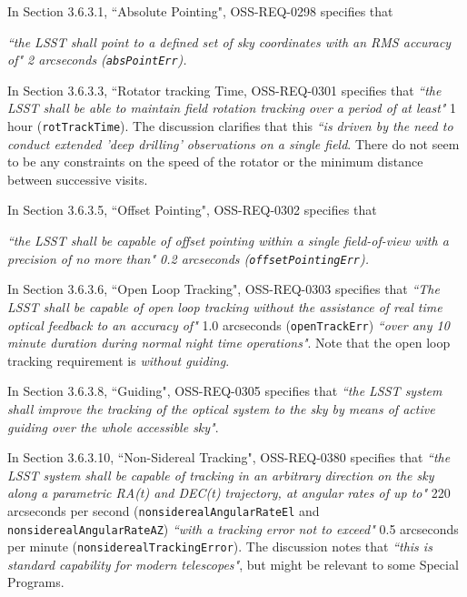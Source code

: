 In Section 3.6.3.1, ``Absolute Pointing", OSS-REQ-0298 specifies that {\it ``the LSST shall point to a defined set of sky coordinates with an RMS accuracy
of" 2 arcseconds ({\tt absPointErr}).

In Section 3.6.3.3, ``Rotator tracking Time, OSS-REQ-0301 specifies that {\it ``the LSST shall be able to maintain field rotation tracking over a period of at least"} 1 hour ({\tt rotTrackTime}).
The discussion clarifies that this {\it ``is driven by the need to conduct extended 'deep drilling' observations on a single field}.
There do not seem to be any constraints on the speed of the rotator or the minimum distance between successive visits.

In Section 3.6.3.5, ``Offset Pointing", OSS-REQ-0302 specifies that {\it ``the LSST shall be capable of offset pointing within a single field-of-view with a precision of no more than" 0.2 arcseconds ({\tt offsetPointingErr}).

In Section 3.6.3.6, ``Open Loop Tracking", OSS-REQ-0303 specifies that {\it ``The LSST shall be capable of open loop tracking without the assistance of real
time optical feedback to an accuracy of"} 1.0 arcseconds ({\tt openTrackErr}) {\it ``over any 10 minute duration during normal night time operations"}.
Note that the open loop tracking requirement is \emph{without guiding}.

In Section 3.6.3.8, ``Guiding", OSS-REQ-0305 specifies that {\it ``the LSST system shall improve the tracking of the optical system to the sky by means of active guiding over the whole accessible sky"}.

In Section 3.6.3.10, ``Non-Sidereal Tracking", OSS-REQ-0380 specifies that {\it ``the LSST system shall be capable of tracking in an arbitrary direction on the sky along a parametric RA(t) and DEC(t) trajectory, at angular rates of up to"} 220 arcseconds per second ({\tt nonsiderealAngularRateEl} and {\tt nonsiderealAngularRateAZ}) {\it ``with a tracking error not to exceed"} 0.5 arcseconds per minute ({\tt nonsiderealTrackingError}).
The discussion notes that {\it ``this is standard capability for modern telescopes"}, but might be relevant to some Special Programs.


}}
